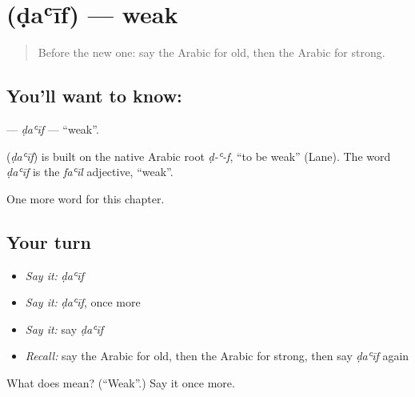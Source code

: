 \section[\texorpdfstring{\ar{ضعيف} (ḍaʿīf)}{ضعيف (ḍaʿīf)}]{ (ḍaʿīf) — weak}

\label{lesson:AR-C154-daif}



\begin{quote}
Before the new one: say the Arabic for old, then the Arabic for strong.
\end{quote}

\subsection*{You'll want to know: }
\textbf{} — \emph{ḍaʿīf} — \textquotedblleft{}weak\textquotedblright{}.

\begin{cousinweb}
\textbf{} (\emph{ḍaʿīf}) is built on the native Arabic root \emph{ḍ-ʿ-f}, \textquotedblleft{}to be weak\textquotedblright{} (Lane). The word \emph{ḍaʿīf} is the \emph{faʿīl} adjective, \textquotedblleft{}weak\textquotedblright{}.
\end{cousinweb}

\begin{grammarlens}[title={What you've built}]
One more word for this chapter.
\end{grammarlens}

\subsection*{Your turn}
\begin{itemize}
\raggedright
  \item \emph{Say it:} \emph{ḍaʿīf}
  \item \emph{Say it:} \emph{ḍaʿīf}, once more
  \item \emph{Say it:} say \emph{ḍaʿīf}
  \item \emph{Recall:} say the Arabic for old, then the Arabic for strong, then say \emph{ḍaʿīf} again
\end{itemize}

\begin{tcolorbox}[breakable,colback=teal!4,colframe=teal!35!black,title={Before you move on}]
What does  mean? (\textquotedblleft{}Weak\textquotedblright{}.) Say it once more.
\end{tcolorbox}
